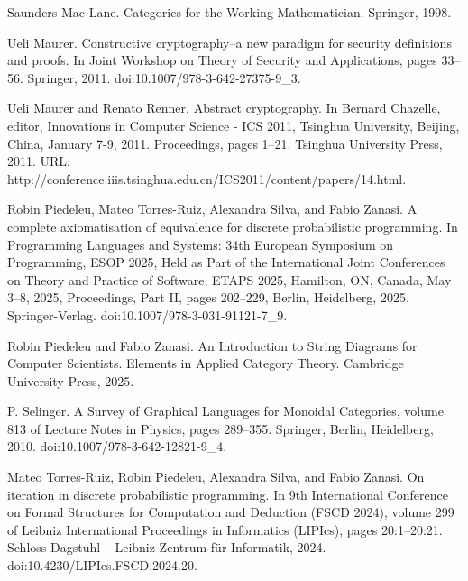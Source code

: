 \par\noindent  [18]  Saunders Mac Lane.  Categories for the Working Mathematician.  Springer, 1998.  
 
\par\noindent  [19]  Ueli Maurer.  Constructive cryptography–a new paradigm for security definitions and proofs.  In Joint Workshop on Theory of Security and Applications, pages 33–56. Springer, 2011.  doi:10.1007/978-3-642-27375-9\_3.  
 
\par\noindent  [20]  Ueli Maurer and Renato Renner.  Abstract cryptography.  In Bernard Chazelle, editor, Innovations in Computer Science - ICS 2011, Tsinghua University, Beijing, China, January 7-9, 2011. Proceedings, pages 1–21. Tsinghua University Press, 2011.  URL: http://conference.iiis.tsinghua.edu.cn/ICS2011/content/papers/14.html.  
 
\par\noindent  [21]  Robin Piedeleu, Mateo Torres-Ruiz, Alexandra Silva, and Fabio Zanasi.  A complete axiomatisation of equivalence for discrete probabilistic programming.  In Programming Languages and Systems: 34th European Symposium on Programming, ESOP 2025, Held as Part of the International Joint Conferences on Theory and Practice of Software, ETAPS 2025, Hamilton, ON, Canada, May 3–8, 2025, Proceedings, Part II, pages 202–229, Berlin, Heidelberg, 2025. Springer-Verlag.  doi:10.1007/978-3-031-91121-7\_9.  
 
\par\noindent  [22]  Robin Piedeleu and Fabio Zanasi.  An Introduction to String Diagrams for Computer Scientists.  Elements in Applied Category Theory. Cambridge University Press, 2025.  
 
\par\noindent  [23]  P. Selinger.  A Survey of Graphical Languages for Monoidal Categories, volume 813 of Lecture Notes in Physics, pages 289–355.  Springer, Berlin, Heidelberg, 2010.  doi:10.1007/978-3-642-12821-9\_4.  
 
\par\noindent  [24]  Mateo Torres-Ruiz, Robin Piedeleu, Alexandra Silva, and Fabio Zanasi.  On iteration in discrete probabilistic programming.  In 9th International Conference on Formal Structures for Computation and Deduction (FSCD 2024), volume 299 of Leibniz International Proceedings in Informatics (LIPIcs), pages 20:1–20:21. Schloss Dagstuhl – Leibniz-Zentrum für Informatik, 2024.  doi:10.4230/LIPIcs.FSCD.2024.20.  
  
